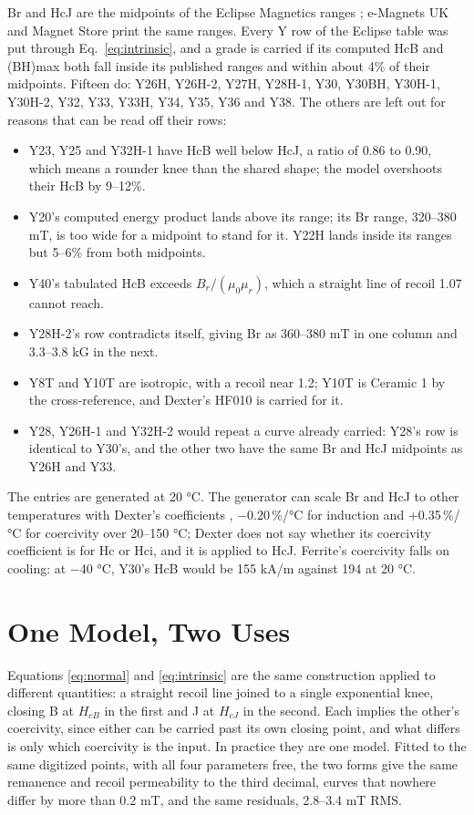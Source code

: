 \documentclass[
  11pt,
]{article}
\providecommand{\tightlist}{%
  \setlength{\itemsep}{0pt}\setlength{\parskip}{0pt}}
\begin{document}
Br and HcJ are the midpoints of the Eclipse Magnetics ranges \cite{eclipse}; e-Magnets UK and Magnet Store \cite{emagnets,magnetstore} print the same ranges. Every Y row of the Eclipse table was put through Eq.~\eqref{eq:intrinsic}, and a grade is carried if its computed HcB and (BH)max both fall inside its published ranges and within about 4\% of their midpoints. Fifteen do: Y26H, Y26H-2, Y27H, Y28H-1, Y30, Y30BH, Y30H-1, Y30H-2, Y32, Y33, Y33H, Y34, Y35, Y36 and Y38. The others are left out for reasons that can be read off their rows:

\begin{itemize}
\tightlist
\item Y23, Y25 and Y32H-1 have HcB well below HcJ, a ratio of 0.86 to 0.90, which means a rounder knee than the shared shape; the model overshoots their HcB by 9--12\%.
\item Y20's computed energy product lands above its range; its Br range, 320--380 mT, is too wide for a midpoint to stand for it. Y22H lands inside its ranges but 5--6\% from both midpoints.
\item Y40's tabulated HcB exceeds \(B_r/(\mu_0\mu_r)\), which a straight line of recoil 1.07 cannot reach.
\item Y28H-2's row contradicts itself, giving Br as 360--380 mT in one column and 3.3--3.8 kG in the next.
\item Y8T and Y10T are isotropic, with a recoil near 1.2; Y10T is Ceramic 1 by the cross-reference, and Dexter's HF010 is carried for it.
\item Y28, Y26H-1 and Y32H-2 would repeat a curve already carried: Y28's row is identical to Y30's, and the other two have the same Br and HcJ midpoints as Y26H and Y33.
\end{itemize}

The entries are generated at 20 °C. The generator can scale Br and HcJ to other temperatures with Dexter's coefficients \cite{dexter}, $-$0.20\,\%/°C for induction and +0.35\,\%/°C for coercivity over 20--150 °C; Dexter does not say whether its coercivity coefficient is for Hc or Hci, and it is applied to HcJ. Ferrite's coercivity falls on cooling: at $-$40 °C, Y30's HcB would be 155 kA/m against 194 at 20 °C.

\section{One Model, Two Uses}\label{one-model}

Equations \eqref{eq:normal} and \eqref{eq:intrinsic} are the same construction applied to different quantities: a straight recoil line joined to a single exponential knee, closing B at \(H_{cB}\) in the first and J at \(H_{cJ}\) in the second. Each implies the other's coercivity, since either can be carried past its own closing point, and what differs is only which coercivity is the input. In practice they are one model. Fitted to the same digitized points, with all four parameters free, the two forms give the same remanence and recoil permeability to the third decimal, curves that nowhere differ by more than 0.2 mT, and the same residuals, 2.8--3.4 mT RMS.
\end{document}
